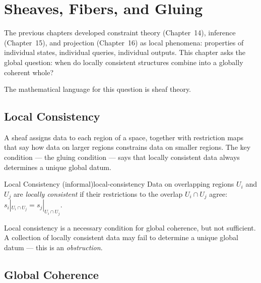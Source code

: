 
\chapter{Sheaves, Fibers, and Gluing}



The previous chapters developed constraint theory (Chapter~14), inference
(Chapter~15), and projection (Chapter~16) as local phenomena: properties
of individual states, individual queries, individual outputs. This chapter
asks the global question: when do locally consistent structures combine
into a globally coherent whole?

The mathematical language for this question is sheaf theory.

\section{Local Consistency}

A sheaf assigns data to each region of a space, together with restriction
maps that say how data on larger regions constrains data on smaller regions.
The key condition — the gluing condition — says that locally consistent
data always determines a unique global datum.

\begin{definition}{Local Consistency (informal)}{local-consistency}
  Data on overlapping regions $U_i$ and $U_j$ are \emph{locally consistent}
  if their restrictions to the overlap $U_i \cap U_j$ agree:
  $s_i|_{U_i \cap U_j} = s_j|_{U_i \cap U_j}$.
\end{definition}

Local consistency is a necessary condition for global coherence, but
not sufficient. A collection of locally consistent data may fail to
determine a unique global datum — this is an \emph{obstruction}.

\section{Global Coherence}

